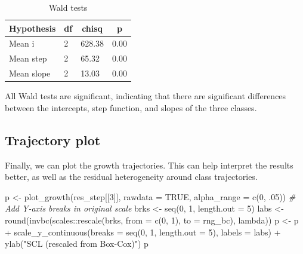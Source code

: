 \documentclass[
  man,floatsintext]{apa6}
\newenvironment{Shaded}{\begin{snugshade}}{\end{snugshade}}
\newcommand{\AttributeTok}[1]{\textcolor[rgb]{0.77,0.63,0.00}{#1}}
\newcommand{\CommentTok}[1]{\textcolor[rgb]{0.56,0.35,0.01}{\textit{#1}}}
\newcommand{\ConstantTok}[1]{\textcolor[rgb]{0.00,0.00,0.00}{#1}}
\newcommand{\DecValTok}[1]{\textcolor[rgb]{0.00,0.00,0.81}{#1}}
\newcommand{\FunctionTok}[1]{\textcolor[rgb]{0.00,0.00,0.00}{#1}}
\newcommand{\NormalTok}[1]{#1}
\newcommand{\OtherTok}[1]{\textcolor[rgb]{0.56,0.35,0.01}{#1}}
\newcommand{\SpecialCharTok}[1]{\textcolor[rgb]{0.00,0.00,0.00}{#1}}
\newcommand{\StringTok}[1]{\textcolor[rgb]{0.31,0.60,0.02}{#1}}
\begin{document}
\begin{table}[tbp]

\begin{center}
\begin{threeparttable}

\caption{\label{tab:waldtests}Wald tests}

\begin{tabular}{llll}
\toprule
Hypothesis & \multicolumn{1}{c}{df} & \multicolumn{1}{c}{chisq} & \multicolumn{1}{c}{p}\\
\midrule
Mean i & 2 & 628.38 & 0.00\\
Mean step & 2 & 65.32 & 0.00\\
Mean slope & 2 & 13.03 & 0.00\\
\bottomrule
\end{tabular}

\end{threeparttable}
\end{center}

\end{table}

All Wald tests are significant, indicating that there are significant
differences between the intercepts, step function, and slopes of the
three classes.

\hypertarget{trajectory-plot}{%
\subsection{Trajectory plot}\label{trajectory-plot}}

Finally, we can plot the growth trajectories. This can help interpret
the results better, as well as the residual heterogeneity around class
trajectories.

\begin{Shaded}
\begin{Highlighting}[]
\NormalTok{p }\OtherTok{\textless{}{-}} \FunctionTok{plot\_growth}\NormalTok{(res\_step[[}\DecValTok{3}\NormalTok{]], }\AttributeTok{rawdata =} \ConstantTok{TRUE}\NormalTok{, }\AttributeTok{alpha\_range =} \FunctionTok{c}\NormalTok{(}\DecValTok{0}\NormalTok{, .}\DecValTok{05}\NormalTok{))}
\CommentTok{\# Add Y{-}axis breaks in original scale}
\NormalTok{brks }\OtherTok{\textless{}{-}} \FunctionTok{seq}\NormalTok{(}\DecValTok{0}\NormalTok{, }\DecValTok{1}\NormalTok{, }\AttributeTok{length.out =} \DecValTok{5}\NormalTok{)}
\NormalTok{labs }\OtherTok{\textless{}{-}} \FunctionTok{round}\NormalTok{(}\FunctionTok{invbc}\NormalTok{(scales}\SpecialCharTok{::}\FunctionTok{rescale}\NormalTok{(brks, }\AttributeTok{from =} \FunctionTok{c}\NormalTok{(}\DecValTok{0}\NormalTok{, }\DecValTok{1}\NormalTok{), }\AttributeTok{to =}\NormalTok{ rng\_bc), lambda))}
\NormalTok{p }\OtherTok{\textless{}{-}}\NormalTok{ p }\SpecialCharTok{+} \FunctionTok{scale\_y\_continuous}\NormalTok{(}\AttributeTok{breaks =} \FunctionTok{seq}\NormalTok{(}\DecValTok{0}\NormalTok{, }\DecValTok{1}\NormalTok{, }\AttributeTok{length.out =} \DecValTok{5}\NormalTok{), }\AttributeTok{labels =}\NormalTok{ labs) }\SpecialCharTok{+} \FunctionTok{ylab}\NormalTok{(}\StringTok{"SCL (rescaled from Box{-}Cox)"}\NormalTok{)}
\NormalTok{p}
\end{Highlighting}
\end{Shaded}
\end{document}
